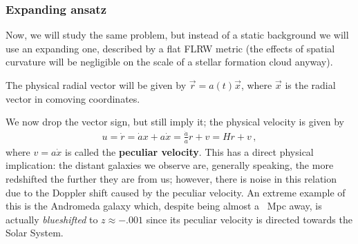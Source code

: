 \documentclass[main.tex]{subfiles}
\begin{document}
\subsubsection{Expanding ansatz}

Now, we will study the same problem, but instead of a static background we will use an expanding one, described by a flat FLRW metric (the effects of spatial curvature will be negligible on the scale of a stellar formation cloud anyway).



The physical radial vector will be given by \(\vec{r} = a(t) \vec{x}\), where \(\vec{x}\) is the radial vector in comoving coordinates.

We now drop the vector sign, but still imply it; the physical velocity is given by 
%
\begin{align}
  u = \dot{r} = \dot{a} x + a \dot{x} 
  = \frac{\dot{a}}{a} r + v = H r + v
\,,
\end{align}
%
where \(v = a \dot{x}\) is called the \textbf{peculiar velocity}.
This has a direct physical implication: the distant galaxies we observe are, generally speaking, the more redshifted the further they are from us; however, there is noise in this relation due to the Doppler shift caused by the peculiar velocity.
An extreme example of this is the Andromeda galaxy which, despite being almost a \SI{}{Mpc} away, is actually \emph{blueshifted} to \(z \approx \num{-.001}\) since its peculiar velocity is directed towards the Solar System. 
\end{document}
